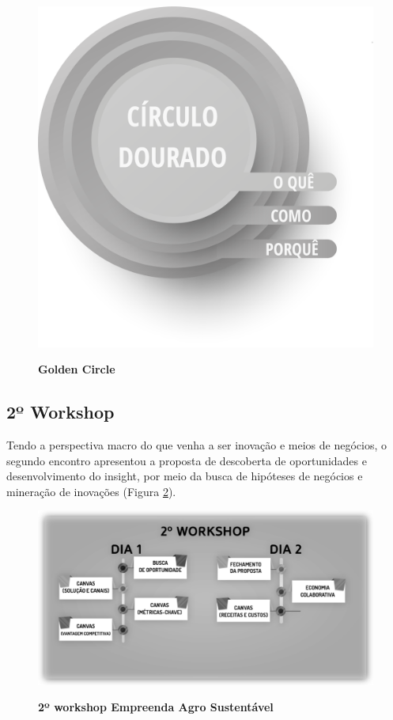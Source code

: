 \begin{figure}[H]
\centering
\caption{\textbf{Golden Circle}}
\includegraphics[scale=0.25]{Imagens/circulo_dourado.png}
\label{figura_5}
\end{figure}

\subsection{2º Workshop}

Tendo a perspectiva macro do que venha a ser inovação e meios de negócios, o segundo encontro apresentou a proposta de descoberta de oportunidades e desenvolvimento do insight, por meio da busca de hipóteses de negócios e mineração de inovações (Figura \ref{figura_31}).




\begin{figure}[H]
\centering
\caption{\textbf{2º workshop Empreenda Agro Sustentável}}
\includegraphics[scale=0.3]{Imagens/workshop-02.png}
\label{figura_31}
\end{figure}

